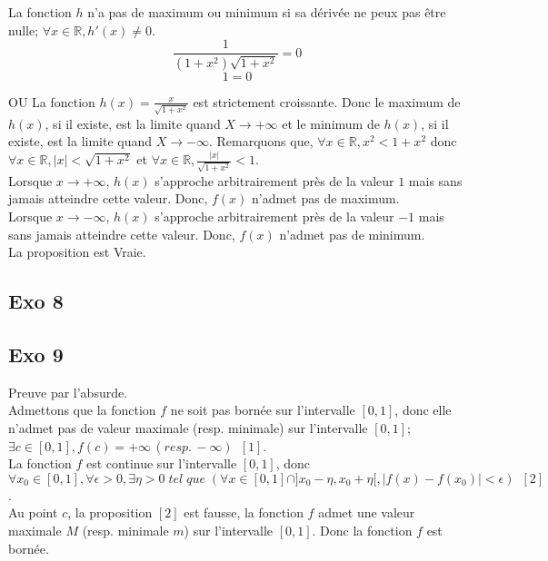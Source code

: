\documentclass[]{book}
\theoremstyle{definition}
\newcommand{\bb}[1]{\mathbb{#1}}
\newcommand{\R}{\bb{R}}
\begin{document}
La fonction $h$ n'a pas de maximum ou minimum si sa d\'eriv\'ee ne peux pas \^etre nulle; $\forall x \in \R, h'(x) \neq 0$.
$$ \frac{1}{(1+x^2)\sqrt{1+x^2}} = 0 $$
$$ 1 = 0 $$


OU
La fonction $h(x) = \frac{x}{\sqrt{1+x^2}}$ est strictement croissante. Donc le maximum de $h(x)$, si il existe, est la limite quand $X \to +\infty$ et le minimum de $h(x)$, si il existe, est la limite quand $X \to -\infty$.
Remarquons que, $\forall x \in \R, x^2 < 1 + x^2$ donc $\forall x \in \R, |x| < \sqrt{1 + x^2}$ et $\forall x \in \R, \frac{|x|}{\sqrt{1 + x^2}} < 1$.\\
 
Lorsque $x \to +\infty$, $h(x)$ s'approche arbitrairement pr\`es de la valeur $1$ mais sans jamais atteindre cette valeur. Donc, $f(x)$ n'admet pas de maximum.\\

Lorsque $x \to -\infty$, $h(x)$ s'approche arbitrairement pr\`es de la valeur $-1$ mais sans jamais atteindre cette valeur. Donc, $f(x)$ n'admet pas de minimum.\\


La proposition est Vraie.



\subsection*{Exo 8}



\subsection*{Exo 9}
Preuve par l'absurde. \\

Admettons que la fonction $f$ ne soit pas born\'ee sur l'intervalle $[0,1]$, donc elle n'admet pas de valeur maximale (resp. minimale) sur l'intervalle $[0,1]$; $\exists c \in [0,1], f(c) = +\infty\, (resp.\, -\infty)\,\,\,[1]$.\\

La fonction $f$ est continue sur l'intervalle $[0,1]$, donc $\forall x_0 \in [0,1], \forall \epsilon >0, \exists \eta > 0\; tel\; que\; (\forall x \in [0,1] \cap ]x_0-\eta, x_0+\eta[, |f(x)-f(x_0)| < \epsilon)\,\,\,[2]$. \\ 

Au point $c$, la proposition $[2]$ est fausse, la fonction $f$ admet une valeur maximale $M$ (resp. minimale $m$) sur l'intervalle $[0,1]$. Donc la fonction $f$ est born\'ee.\\
\end{document}
